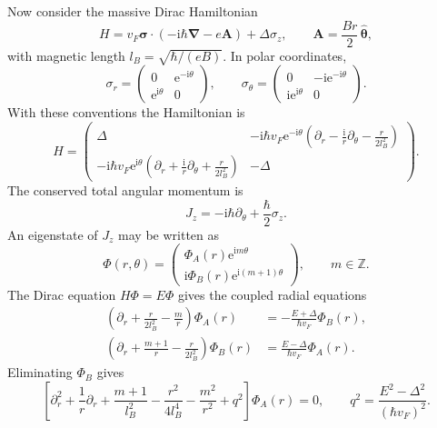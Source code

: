\documentclass[11pt]{article}
\newcommand{\ii}{\mathrm i}
\newcommand{\ee}{\mathrm e}
\newcommand{\bsigma}{\bm{\sigma}}
\begin{document}
Now consider the massive Dirac Hamiltonian
\begin{equation}
  H=v_F\bsigma\cdot(-\ii\hbar\bm\nabla-e\bm A)+\Delta\sigma_z,
  \qquad \bm A=\frac{B r}{2}\,\hat{\bm\theta},
\end{equation}
with magnetic length \(l_B=\sqrt{\hbar/(eB)}\). In polar coordinates,
\begin{equation}
  \sigma_r=\begin{pmatrix}0&\ee^{-\ii\theta}\\ \ee^{\ii\theta}&0\end{pmatrix},
  \qquad
  \sigma_\theta=\begin{pmatrix}0&-\ii\ee^{-\ii\theta}\\ \ii\ee^{\ii\theta}&0\end{pmatrix}.
\end{equation}
With these conventions the Hamiltonian is
\begin{equation}
  H=
  \begin{pmatrix}
    \Delta & -\ii\hbar v_F\ee^{-\ii\theta}\left(\partial_r-\frac{\ii}{r}\partial_\theta-\frac{r}{2l_B^2}\right)\\
    -\ii\hbar v_F\ee^{\ii\theta}\left(\partial_r+\frac{\ii}{r}\partial_\theta+\frac{r}{2l_B^2}\right)&-\Delta
  \end{pmatrix}.
\end{equation}
The conserved total angular momentum is
\begin{equation}
  J_z=-\ii\hbar\partial_\theta+\frac{\hbar}{2}\sigma_z .
\end{equation}
An eigenstate of \(J_z\) may be written as
\begin{equation}
  \Phi(r,\theta)=
  \begin{pmatrix}
    \Phi_A(r)\ee^{\ii m\theta}\\
    \ii\Phi_B(r)\ee^{\ii(m+1)\theta}
  \end{pmatrix},
  \qquad m\in\mathbb Z .
\end{equation}
The Dirac equation \(H\Phi=E\Phi\) gives the coupled radial equations
\begin{align}
  \left(\partial_r+\frac{r}{2l_B^2}-\frac{m}{r}\right)\Phi_A(r)
    &=-\frac{E+\Delta}{\hbar v_F}\Phi_B(r),\\
  \left(\partial_r+\frac{m+1}{r}-\frac{r}{2l_B^2}\right)\Phi_B(r)
    &=\frac{E-\Delta}{\hbar v_F}\Phi_A(r).
\end{align}
Eliminating \(\Phi_B\) gives
\begin{equation}
  \left[\partial_r^2+\frac{1}{r}\partial_r+\frac{m+1}{l_B^2}
  -\frac{r^2}{4l_B^4}-\frac{m^2}{r^2}+q^2\right]\Phi_A(r)=0,
  \qquad
  q^2=\frac{E^2-\Delta^2}{(\hbar v_F)^2}.
\end{equation}
\end{document}
